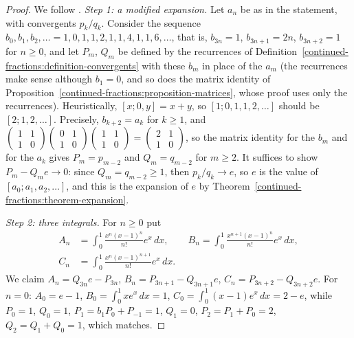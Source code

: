 \begin{proof}
We follow \cite{cohn-e}. \emph{Step 1: a modified expansion.} Let $a_n$ be as in the statement, with convergents $p_k/q_k$. Consider the sequence $b_0, b_1, b_2, \ldots = 1, 0, 1, 1, 2, 1, 1, 4, 1, 1, 6, \ldots$, that
is, $b_{3n} = 1$, $b_{3n+1} = 2n$, $b_{3n+2} = 1$ for $n \geq 0$, and let $P_m$, $Q_m$ be defined by the recurrences of Definition~\ref{continued-fractions:definition-convergents} with these $b_m$
in place of the $a_m$ (the recurrences make sense although $b_1 = 0$, and so does the matrix identity of Proposition~\ref{continued-fractions:proposition-matrices}, whose proof uses only the
recurrences). Heuristically, $[x; 0, y] = x + y$, so $[1; 0, 1, 1, 2, \ldots]$ should be $[2; 1, 2, \ldots]$. Precisely, $b_{k+2} = a_k$ for $k \geq 1$, and
$\begin{pmatrix}1 & 1\\ 1 & 0\end{pmatrix}\begin{pmatrix}0 & 1\\ 1 & 0\end{pmatrix}\begin{pmatrix}1 & 1\\ 1 & 0\end{pmatrix} = \begin{pmatrix}2 & 1\\ 1 & 0\end{pmatrix}$, so the matrix identity
for the $b_m$ and for the $a_k$ gives $P_m = p_{m-2}$ and $Q_m = q_{m-2}$ for $m \geq 2$. It suffices to show $P_m - Q_me \to 0$: since $Q_m = q_{m-2} \geq 1$, then $p_k/q_k \to e$, so $e$ is the
value of $[a_0; a_1, a_2, \ldots]$, and this is the expansion of $e$ by Theorem~\ref{continued-fractions:theorem-expansion}.

\emph{Step 2: three integrals.} For $n \geq 0$ put
\[
\begin{aligned}
A_n &= \int_0^1\frac{x^n(x - 1)^n}{n!}e^x\,dx, \qquad B_n = \int_0^1\frac{x^{n+1}(x - 1)^n}{n!}e^x\,dx,\\
C_n &= \int_0^1\frac{x^n(x - 1)^{n+1}}{n!}e^x\,dx.
\end{aligned}
\]
We claim $A_n = Q_{3n}e - P_{3n}$, $B_n = P_{3n+1} - Q_{3n+1}e$, $C_n = P_{3n+2} - Q_{3n+2}e$. For $n = 0$: $A_0 = e - 1$, $B_0 = \int_0^1xe^x\,dx = 1$, $C_0 = \int_0^1(x - 1)e^x\,dx = 2 - e$, while
$P_0 = 1$, $Q_0 = 1$, $P_1 = b_1P_0 + P_{-1} = 1$, $Q_1 = 0$, $P_2 = P_1 + P_0 = 2$, $Q_2 = Q_1 + Q_0 = 1$, which matches.


\end{proof}
